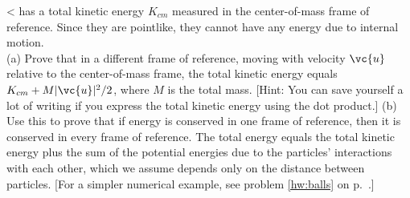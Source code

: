 <%
has a total kinetic energy $K_{cm}$ measured in the
center-of-mass frame of reference. Since they are pointlike,
they cannot have any energy due to internal motion.\\
(a) Prove that in a different frame of reference, moving with
velocity $\vc{u}$ relative to the center-of-mass frame, the total
kinetic energy equals $K_{cm}+M|\vc{u}|^2/2$, where $M$ is the
total mass. [Hint: You can save yourself a lot of writing if
you express the total kinetic energy using the dot product.]\hwendpart
(b) Use this to prove that if energy is conserved in one
frame of reference, then it is conserved in every frame of
reference. The total energy equals the total kinetic energy
plus the sum of the potential energies due to the particles'
interactions with each other, which we assume depends only
on the distance between particles. [For a simpler numerical
example, see problem \ref{hw:balls} on p.~\pageref{hw:balls}.]

